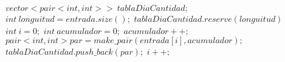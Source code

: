 
\begin{algorithmic}[1]
	
	\Statex
	\State$vector<pair<int, int> > \: tablaDiaCantidad;$
	\State$int \: longuitud = entrada.size();$
	\State$tablaDiaCantidad.reserve(longuitud)$
	\State$int \: i=0;$
	\State$int \: acumulador = 0;$
		\State $acumulador++;$
			\State $pair<int, int> par = make\_pair(entrada[i], acumulador);$
			\State $tablaDiaCantidad.push\_back(par);$
		\EndIf
		\State$i++;$
	\EndWhile
	\EndProcedure
	\Statex
	\end{algorithmic}

